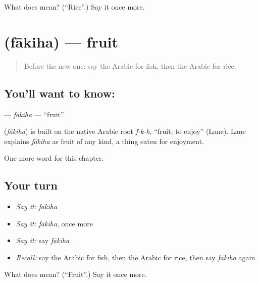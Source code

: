 \begin{tcolorbox}[breakable,colback=teal!4,colframe=teal!35!black,title={Before you move on}]
What does  mean? (\textquotedblleft{}Rice\textquotedblright{}.) Say it once more.
\end{tcolorbox}
\section[\texorpdfstring{\ar{فاكهة} (fākiha)}{فاكهة (fākiha)}]{ (fākiha) — fruit}

\label{lesson:AR-C66-fakiha}



\begin{quote}
Before the new one: say the Arabic for fish, then the Arabic for rice.
\end{quote}

\subsection*{You'll want to know: }
\textbf{} — \emph{fākiha} — \textquotedblleft{}fruit\textquotedblright{}.

\begin{cousinweb}
\textbf{} (\emph{fākiha}) is built on the native Arabic root \emph{f-k-h}, \textquotedblleft{}fruit; to enjoy\textquotedblright{} (Lane). Lane explains \emph{fākiha} as fruit of any kind, a thing eaten for enjoyment.
\end{cousinweb}

\begin{grammarlens}[title={What you've built}]
One more word for this chapter.
\end{grammarlens}

\subsection*{Your turn}
\begin{itemize}
\raggedright
  \item \emph{Say it:} \emph{fākiha}
  \item \emph{Say it:} \emph{fākiha}, once more
  \item \emph{Say it:} say \emph{fākiha}
  \item \emph{Recall:} say the Arabic for fish, then the Arabic for rice, then say \emph{fākiha} again
\end{itemize}

\begin{tcolorbox}[breakable,colback=teal!4,colframe=teal!35!black,title={Before you move on}]
What does  mean? (\textquotedblleft{}Fruit\textquotedblright{}.) Say it once more.
\end{tcolorbox}
